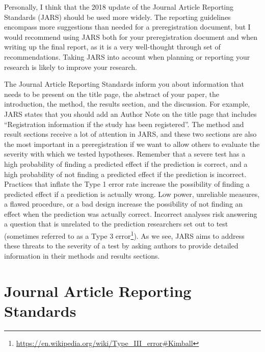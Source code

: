 \documentclass[
  oneside]{krantz}
\renewcommand{\href}[2]{#2\footnote{\url{#1}}}
\begin{document}
Personally, I think that the 2018 update of the Journal Article Reporting Standards (JARS) \citep{appelbaum_journal_2018} should be used more widely. The reporting guidelines encompass more suggestions than needed for a preregistration document, but I would recommend using JARS both for your preregistration document and when writing up the final report, as it is a very well-thought through set of recommendations. Taking JARS into account when planning or reporting your research is likely to improve your research.

The Journal Article Reporting Standards inform you about information that needs to be present on the title page, the abstract of your paper, the introduction, the method, the results section, and the discussion. For example, JARS states that you should add an Author Note on the title page that includes ``Registration information if the study has been registered''. The method and result sections receive a lot of attention in JARS, and these two sections are also the most important in a preregistration if we want to allow others to evaluate the severity with which we tested hypotheses. Remember that a severe test has a high probability of finding a predicted effect if the prediction is correct, and a high probability of not finding a predicted effect if the prediction is incorrect. Practices that inflate the Type 1 error rate increase the possibility of finding a predicted effect if a prediction is actually wrong. Low power, unreliable measures, a flawed procedure, or a bad design increase the possibility of not finding an effect when the prediction was actually correct. Incorrect analyses risk answering a question that is unrelated to the prediction researchers set out to test (sometimes referred to as a \href{https://en.wikipedia.org/wiki/Type_III_error\#Kimball}{Type 3 error}). As we see, JARS aims to address these threats to the severity of a test by asking authors to provide detailed information in their methods and results sections.

\hypertarget{journal-article-reporting-standards}{%
\section{Journal Article Reporting Standards}\label{journal-article-reporting-standards}}
\end{document}

